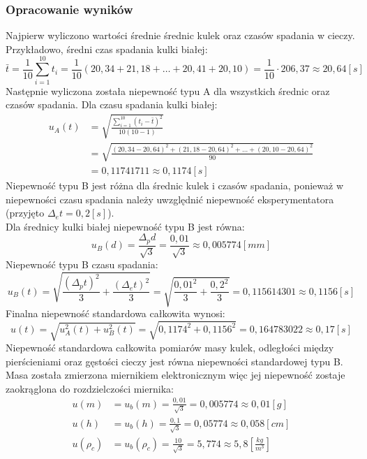 \documentclass[polish, 11pt, a4paper]{article}
\begin{document}
	\subsubsection{Opracowanie wyników}
		Najpierw wyliczono wartości średnie średnic kulek oraz czasów spadania w cieczy. Przykładowo, średni czas spadania kulki białej:
		\begin{displaymath}
		\bar{t}=\frac{1}{10}\sum_{i=1}^{10}t_i=\frac{1}{10}(20,34+21,18+\dots+20,41+20,10)=\frac{1}{10}\cdot 206,37\approx 20,64[s]
		\end{displaymath}
		Następnie wyliczona została niepewność typu A dla wszystkich średnic oraz czasów spadania. Dla czasu spadania kulki białej:
		\begin{align*}
		u_A(t)&=\sqrt{\frac{\sum_{i=1}^{10} (t_i-\bar{t})^2}{10(10-1)}}\\
				&=\sqrt{\frac{(20,34-20,64)^2+(21,18-20,64)^2+\dots+(20,10-20,64)^2}{90}}\\
				&=0,11741711\approx 0,1174[s]
		\end{align*}
		Niepewność typu B jest różna dla średnic kulek i czasów spadania, ponieważ w niepewności czasu spadania należy uwzględnić niepewność eksperymentatora (przyjęto \(\Delta{_et}=0,2[s]\)).\\
		Dla średnicy kulki białej niepewność typu B jest równa:
		\begin{displaymath}
		u_B(d)	= \frac{\Delta{_pd}}{\sqrt{3}}=\frac{0,01}{\sqrt{3}}\approx 0,005774[mm]
		\end{displaymath}
		Niepewność typu B czasu spadania:
		\begin{displaymath}
		u_B(t)	=\sqrt{\frac{(\Delta{_pt})^2}{3}+\frac{(\Delta{_et})^2}{3}}=\sqrt{\frac{0,01^2}{3}+\frac{0,2^2}{3}}
				=0,115614301\approx 0,1156[s]
		\end{displaymath}
		Finalna niepewność standardowa całkowita wynosi:
		\begin{displaymath}
			u(t)=\sqrt{u_A^2(t)+u_B^2(t)}=\sqrt{0,1174^2+0,1156^2}=0,164783022\approx 0,17[s]
		\end{displaymath} 
		Niepewność standardowa całkowita pomiarów masy kulek, odległości między pierścieniami oraz gęstości cieczy jest równa niepewności standardowej typu B. Masa została zmierzona miernikiem elektronicznym więc jej niepewność zostaje zaokrąglona do rozdzielczości miernika:
		\begin{align*}
		u(m)		&=u_b(m)=\frac{0,01}{\sqrt{3}} = 0,005774 \approx 0,01[g]\\
		u(h)		&=u_b(h)=\frac{0,1}{\sqrt{3}} = 0,05774 \approx 0,058[cm]\\
		u(\rho_c)	&=u_b(\rho_c)=\frac{10}{\sqrt{3}}= 5,774\approx 5,8 \left[\frac{kg}{m^3}\right]
		\end{align*}
\end{document}
